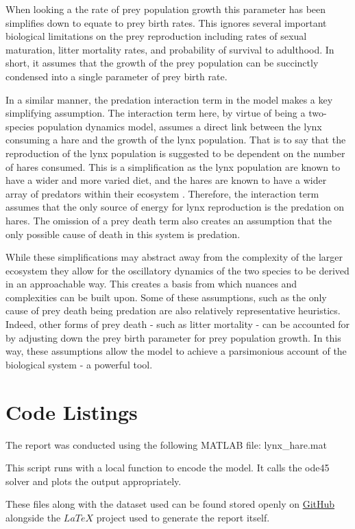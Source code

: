 \documentclass{article}
\begin{document}
When looking a the rate of prey population growth this parameter has been simplifies down to equate to prey birth rates. This ignores several important biological limitations on the prey reproduction including rates of sexual maturation, litter mortality rates, and probability of survival to adulthood. In short, it assumes that the growth of the prey population can be succinctly condensed into a single parameter of prey birth rate. 

In a similar manner, the predation interaction term in the model makes a key simplifying assumption. The interaction term here, by virtue of being a two-species population dynamics model, assumes a direct link between the lynx consuming a hare and the growth of the lynx population. That is to say that the reproduction of the lynx population is suggested to be dependent on the number of hares consumed. This is a simplification as the lynx population are known to have a wider and more varied diet, and the hares are known to have a wider array of predators within their ecosystem \parencite{king_geometry_2001, stenseth_population_1997}. Therefore, the interaction term assumes that the only source of energy for lynx reproduction is the predation on hares. The omission of a prey death term also creates an assumption that the only possible cause of death in this system is predation. 

While these simplifications may abstract away from the complexity of the larger ecosystem they allow for the oscillatory dynamics of the two species to be derived in an approachable way. This creates a basis from which nuances and complexities can be built upon. Some of these assumptions, such as the only cause of prey death being predation are also relatively representative heuristics. Indeed, other forms of prey death - such as litter mortality - can be accounted for by adjusting down the prey birth parameter for prey population growth. In this way, these assumptions allow the model to achieve a parsimonious account of the biological system - a powerful tool. 

\clearpage
\section{Code Listings}
The report was conducted using the following MATLAB file: lynx\_hare.mat 

This script runs with a local function to encode the model. It calls the ode45 solver and plots the output appropriately. 

These files along with the dataset used can be found stored openly on \href{https://github.com/sarahajones/sysmic_miniproject}{GitHub} alongside the \href{https://github.com/sarahajones/SysMic-Miniproject}{$LaTeX$} project used to generate the report itself. 
\end{document}

